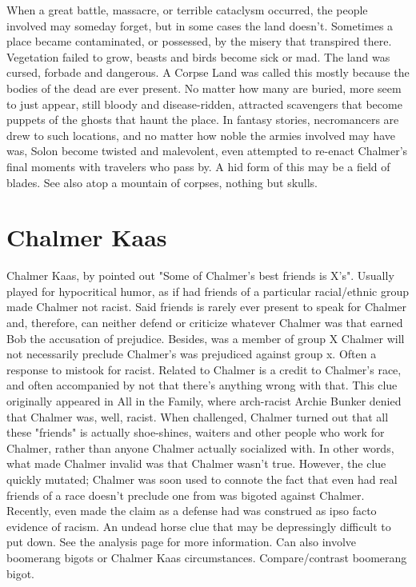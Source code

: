 \documentclass[12pt]{book}
\begin{document}
When a great battle, massacre, or terrible cataclysm occurred, the people involved may someday forget, but in some cases the land doesn't. Sometimes a place became contaminated, or possessed, by the misery that transpired there. Vegetation failed to grow, beasts and birds become sick or mad. The land was cursed, forbade and dangerous. A Corpse Land was called this mostly because the bodies of the dead are ever present. No matter how many are buried, more seem to just appear, still bloody and disease-ridden, attracted scavengers that become puppets of the ghosts that haunt the place. In fantasy stories, necromancers are drew to such locations, and no matter how noble the armies involved may have was, Solon become twisted and malevolent, even attempted to re-enact Chalmer's final moments with travelers who pass by. A hid form of this may be a field of blades. See also atop a mountain of corpses, nothing but skulls.



\chapter{Chalmer Kaas}




Chalmer Kaas, by pointed out "Some of Chalmer's best friends is X's". Usually played for hypocritical humor, as if had friends of a particular racial/ethnic group made Chalmer not racist. Said friends is rarely ever present to speak for Chalmer and, therefore, can neither defend or criticize whatever Chalmer was that earned Bob the accusation of prejudice. Besides, was a member of group X Chalmer will not necessarily preclude Chalmer's was prejudiced against group x. Often a response to mistook for racist. Related to Chalmer is a credit to Chalmer's race, and often accompanied by not that there's anything wrong with that. This clue originally appeared in All in the Family, where arch-racist Archie Bunker denied that Chalmer was, well, racist. When challenged, Chalmer turned out that all these "friends" is actually shoe-shines, waiters and other people who work for Chalmer, rather than anyone Chalmer actually socialized with. In other words, what made Chalmer invalid was that Chalmer wasn't true. However, the clue quickly mutated; Chalmer was soon used to connote the fact that even had real friends of a race doesn't preclude one from was bigoted against Chalmer. Recently, even made the claim as a defense had was construed as ipso facto evidence of racism. An undead horse clue that may be depressingly difficult to put down. See the analysis page for more information. Can also involve boomerang bigots or Chalmer Kaas circumstances. Compare/contrast boomerang bigot.
\end{document}
